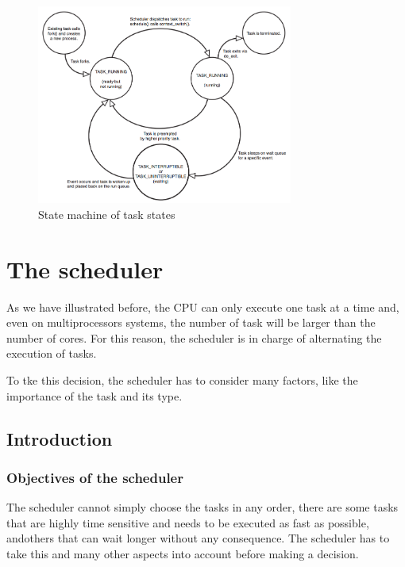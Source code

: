 \documentclass[10pt]{book}
\begin{document}
\begin{figure}[ht]
  \centering
  \includegraphics[width=0.75\textwidth]{process_life} %
  \caption{State machine of task states}
  \label{img:process_life}
\end{figure}

\chapter{The scheduler}
\label{ch:sched}

As we have illustrated before, the CPU can only execute one task at a time and, even on multiprocessors systems, the number of task will be larger than the number of cores. For this reason, the scheduler is in charge of  alternating the execution of tasks.

To tke this decision, the scheduler has to consider many factors, like
the importance of the task and its type.

\section{Introduction}%

\subsection{Objectives of the scheduler}

The scheduler cannot simply choose the tasks in any order, there are some tasks that are highly time sensitive and needs to be executed as fast as possible, andothers that can wait longer without any consequence. The scheduler has to take this and many other aspects into account before making a decision.
\end{document}
